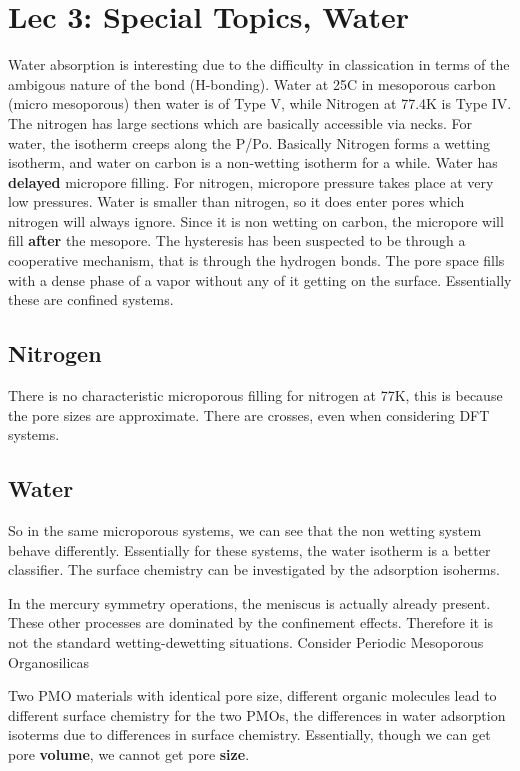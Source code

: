 \documentclass[12pt,a4paper,oneside,headinclude]{scrartcl}
\numberwithin{figure}{section}
\numberwithin{equation}{section}
\numberwithin{table}{section}
\begin{document}
\section{Lec 3: Special Topics, Water}
\label{sec:orge1efda9}
Water absorption is interesting due to the difficulty in classication in terms
of the ambigous nature of the bond (H-bonding). Water at 25C in mesoporous
carbon (micro mesoporous) then water is of Type V, while Nitrogen at 77.4K is
Type IV. The nitrogen has large sections which are basically accessible via
necks. For water, the isotherm creeps along the P/Po. Basically Nitrogen forms a
wetting isotherm, and water on carbon is a non-wetting isotherm for a while.
Water has \textbf{delayed} micropore filling. For nitrogen, micropore pressure takes
place at very low pressures. Water is smaller than nitrogen, so it does enter
pores which nitrogen will always ignore. Since it is non wetting on carbon, the
micropore will fill \textbf{after} the mesopore. The hysteresis has been suspected to
be through a cooperative mechanism, that is through the hydrogen bonds. The pore
space fills with a dense phase of a vapor without any of it getting on the
surface. Essentially these are confined systems.

\subsection{Nitrogen}
\label{sec:orgfe6b6e7}
There is no characteristic microporous filling for nitrogen at 77K, this is
because the pore sizes are approximate. There are crosses, even when considering
DFT systems.
\subsection{Water}
\label{sec:org450b86b}
So in the same microporous systems, we can see that the non wetting system
behave differently. Essentially for these systems, the water isotherm is a
better classifier. The surface chemistry can be investigated by the adsorption
isoherms.

In the mercury symmetry operations, the meniscus is actually already present.
These other processes are dominated by the confinement effects. Therefore it is
not the standard wetting-dewetting situations.
Consider Periodic Mesoporous Organosilicas

Two PMO materials with identical pore size, different organic molecules lead to
different surface chemistry for the two PMOs, the differences in water
adsorption isoterms due to differences in surface chemistry.
Essentially, though we can get pore \textbf{volume}, we cannot get pore \textbf{size}.
\end{document}
